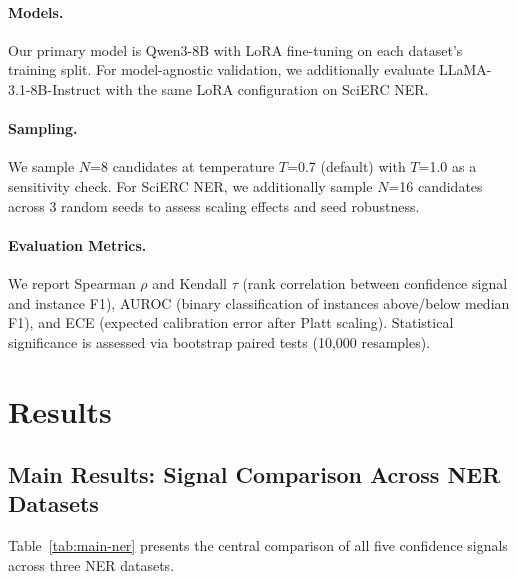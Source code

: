 \documentclass[11pt,a4paper]{article}
\begin{document}
\paragraph{Models.}
Our primary model is Qwen3-8B with LoRA fine-tuning on each dataset's training split.
For model-agnostic validation, we additionally evaluate LLaMA-3.1-8B-Instruct with the same LoRA configuration on SciERC NER.

\paragraph{Sampling.}
We sample $N$=8 candidates at temperature $T$=0.7 (default) with $T$=1.0 as a sensitivity check.
For SciERC NER, we additionally sample $N$=16 candidates across 3 random seeds to assess scaling effects and seed robustness.

\paragraph{Evaluation Metrics.}
We report Spearman $\rho$ and Kendall $\tau$ (rank correlation between confidence signal and instance F1), AUROC (binary classification of instances above/below median F1), and ECE (expected calibration error after Platt scaling).
Statistical significance is assessed via bootstrap paired tests (10,000 resamples).

\section{Results}
\label{sec:results}

\subsection{Main Results: Signal Comparison Across NER Datasets}
\label{sec:main-results}

Table~\ref{tab:main-ner} presents the central comparison of all five confidence signals across three NER datasets.
\end{document}
